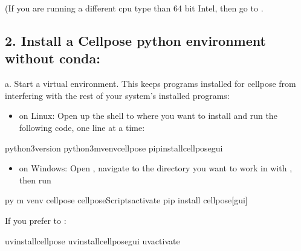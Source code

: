 \documentclass[letterpaper,10pt,english]{jupyterBook}
\begin{document}
\sphinxAtStartPar
(If you are running a different cpu type than 64 bit Intel, then go to .


\subsection{2. Install a Cellpose python environment without conda:}
\label{\detokenize{cellpose:install-a-cellpose-python-environment-without-conda}}
\sphinxAtStartPar
a. Start a virtual environment. This keeps programs installed for cellpose from interfering with the rest of your system’s installed programs:
\begin{itemize}
\item {} 
\sphinxAtStartPar
on Linux: Open up the shell to where you want to install and run the following code, one line at a time:

\end{itemize}

\begin{sphinxVerbatim}[commandchars=\\\{\}]
python3\PYGZhy{}\PYGZhy{}version
python3\PYGZhy{}mvenvcellpose
pipinstallcellpose\PYG{o}{[}gui\PYG{o}{]}
\end{sphinxVerbatim}
\begin{itemize}
\item {} 
\sphinxAtStartPar
on Windows: Open , navigate to the directory you want to work in with , then run

\end{itemize}

\begin{sphinxVerbatim}[commandchars=\\\{\}]
py \PYGZhy{}m venv cellpose
cellpose\PYGZbs{}Scripts\PYGZbs{}activate
pip install cellpose[gui]
\end{sphinxVerbatim}

\sphinxAtStartPar
If you prefer  to :

\begin{sphinxVerbatim}[commandchars=\\\{\}]
uvinstallcellpose
uvinstallcellpose\PYG{o}{[}gui\PYG{o}{]}
uvactivate
\end{sphinxVerbatim}
\end{document}
